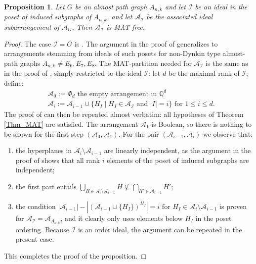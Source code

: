 \documentclass[12pt]{amsart}
\newcommand\CA{{\mathscr A}}
\newcommand\CI{{\mathcal I}}
\numberwithin{equation}{section}
\theoremstyle{plain}
\newtheorem{prop}[equation]{Proposition}
\theoremstyle{definition}
\begin{document}
\begin{prop}
\label{prop:idealAG}    
Let $G$ be  an almost path graph $A_{n,k}$ and let 
$\mathcal{I}$ be an ideal in the poset of induced subgraphs of $A_{n,k}$, and let $\CA_\CI$ be the associated ideal subarrangement of $\CA_G$.
Then $\CA_\CI$ is MAT-free.
\end{prop}

\begin{proof}
    The case $\CI = G$ 
    is \cite[Thm.~4.1]{cuntzkuehne:subgraphs}.
	The argument in the proof of \cite[Thm.~4.1]{cuntzkuehne:subgraphs} generalizes to arrangements stemming from ideals of such posets for non-Dynkin type almost-path graphs $A_{n,k}\neq E_6,E_7,E_8$.
	 The MAT-partition needed for $\CA_\CI$  is the same as in the proof of \cite[Thm.~4.1]{cuntzkuehne:subgraphs}, simply restricted to the ideal $\mathcal{I}$: let $d$ be the maximal rank of $\mathcal{I}$; define: \begin{align*} &\CA_0 := \Phi_d \text{ the empty arrangement in } \mathbb{Q}^{d} \\ &\CA_{i} := \CA_{i-1} \cup \{H_I\mid H_I\in \CA_{\mathcal{I}} \text{ and } |I|=i\} \text{ for }1\leq i\leq d. \end{align*}
	The proof of \cite[Thm.~4.1]{cuntzkuehne:subgraphs} can then be repeated almost verbatim: all hypotheses of Theorem \ref{Thm_MAT} 
 are satisfied. The arrangement $\CA_1$ is Boolean, so there is nothing to be shown for the first step $(\CA_0,\CA_1)$. For the pair $(\CA_{i-1},\CA_i)$ we observe that:
	\begin{enumerate}
		\item the hyperplanes in $\CA_i\setminus \CA_{i-1}$ are linearly independent, as the argument in the proof of \cite[Thm.~4.1]{cuntzkuehne:subgraphs} shows that all rank $i$ elements of the poset of induced subgraphs are independent; 
		\item the first part entails $\bigcup_{H \in \CA_i\setminus \CA_{i-1}} H \nsubseteq \bigcap_{H' \in \CA_{i-1}} H'$; 
		\item the condition $|\CA_{i-1}|-|(\CA_{i-1}\cup \{H_I\})^{H_I}| = i$ for $H_I\in \CA_i\setminus \CA_{i-1}$ is proven for $\CA_{\mathcal{I}} = \CA_{A_{n,k}}$, and it clearly only uses elements below $H_I$ in the poset ordering. Because $\mathcal{I}$ is an order ideal, the argument can be repeated in the present case.
	\end{enumerate}  
 This completes the proof of the proposition.
\end{proof}
\end{document}
